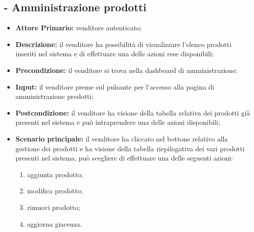 \subsection{ - Amministrazione prodotti}
\begin{itemize}
    \item \textbf{Attore Primario:} venditore autenticato;
    \item \textbf{Descrizione:} il venditore ha possibilità di visualizzare l’elenco prodotti inseriti nel sistema e di effettuare una delle azioni rese disponibili;
    \item \textbf{Precondizione:} il venditore si trova nella dashboard di amministrazione;
    \item \textbf{Input:} il venditore preme sul pulsante per l'accesso alla pagina di amministrazione prodotti;
    \item \textbf{Postcondizione:} il venditore ha visione della tabella relativa dei prodotti già presenti nel sistema e può intraprendere una delle azioni disponibili;
    \item \textbf{Scenario principale:} il venditore ha cliccato nel bottone relativo alla gestione dei prodotti e ha visione della tabella riepilogativa dei vari prodotti presenti nel sistema, può scegliere di effettuare una delle seguenti azioni:
    \begin{enumerate}
        \item aggiunta prodotto;
        \item modifica prodotto;
        \item rimuovi prodotto;
        \item aggiorna giacenza.
    \end{enumerate}
\end{itemize}

\stepsubUserCase
